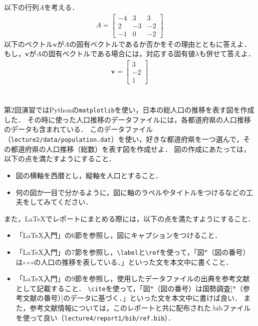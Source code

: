 \documentclass[a4paper,12pt]{jsarticle}
\begin{document}
以下の行列$A$を考える．
\begin{align*}
    A=
    \begin{bmatrix}
        -4 & 3 & 3 \\
        2 & -3 & -2 \\
        -1 & 0 & -2
    \end{bmatrix}
\end{align*}
以下のベクトル$\bm{v}$が$A$の固有ベクトルであるか否かをその理由とともに答えよ．
もし，$\bm{v}$が$A$の固有ベクトルである場合には，対応する固有値$\lambda$も併せて答えよ．
\begin{align*}
    \bm{v}
    =
    \begin{bmatrix}
        3 \\
        -2 \\
        1
    \end{bmatrix}
\end{align*}



\section{}
\label{sec:plot}

第2回演習ではPythonの\texttt{matplotlib}を使い，日本の総人口の推移を表す図を作成した．
その時に使った人口推移のデータファイルには，各都道府県の人口推移のデータも含まれている．
このデータファイル（\texttt{lecture2/data/population.dat}）を使い，好きな都道府県を一つ選んで，その都道府県の人口推移（総数）を表す図を作成せよ．
図の作成にあたっては，以下の点を満たすようにすること．
\begin{itemize}
    \item 図の横軸を西暦とし，縦軸を人口とすること．
    \item 何の図か一目で分かるように，図に軸のラベルやタイトルをつけるなどの工夫をしてみてください．
\end{itemize}
また，\LaTeX でレポートにまとめる際には，以下の点を満たすようにすること．
\begin{itemize}
    \item 「\LaTeX 入門」の6節を参照し，図にキャプションをつけること．
    \item 「\LaTeX 入門」の7節を参照し，\texttt{\textbackslash label}と\texttt{\textbackslash ref}を使って，「図$*$（図の番号）は$\circ\circ\circ$の人口の推移を表している．」といった文を本文中に書くこと．
    \item 「\LaTeX 入門」の9節を参照し，使用したデータファイルの出典を参考文献として記載すること．
    \texttt{\textbackslash cite}を使って，「図$*$（図の番号）は国勢調査[$*$（参考文献の番号）]のデータに基づく．」といった文を本文中に書けば良い．
    また，参考文献情報については，このレポートと共に配布された.bibファイルを使って良い（\texttt{lecture4/report1/bib/ref.bib}）．
\end{itemize}
\end{document}
